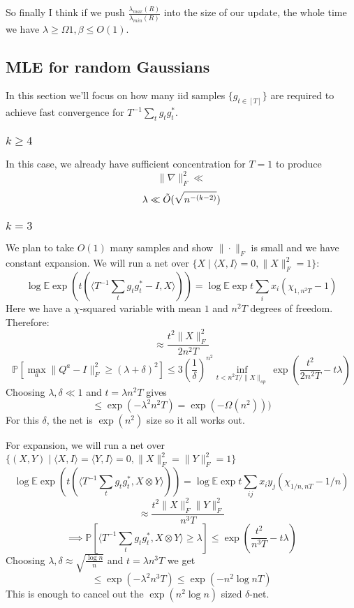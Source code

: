 \documentclass{article}
\newcommand{\E}{\mathbb{E}}
\renewcommand{\Pr}{\mathbb{P}}
\begin{document}
So finally I think if we push $\frac{\lambda_{max}(R)}{\lambda_{min}(R)}$ into the size of our update, the whole time we have $\lambda \geq \Omega 1, \beta \leq O(1)$. 


\subsection{MLE for random Gaussians}
In this section we'll focus on how many iid samples $\{g_{t \in [T]}\} $ are required to achieve fast convergence for $T^{-1} \sum_{t} g_{t} g_{t}^{*}$. 

\subsubsection{$k \geq 4$}
In this case, we already have sufficient concentration for $T=1$ to produce
\[ \|\nabla\|_{F}^{2} \ll    \]
\[ \lambda \ll \Tilde{O}(\sqrt{n^{-(k-2)}})   \]

\subsubsection{$k=3$}
We plan to take $O(1)$ many samples and show $\|\cdot\|_{F}$ is small and we have constant expansion. We will run a net over $\{X \mid \langle X, I \rangle = 0, \|X\|_{F}^{2} = 1\}$:
\[ \log \E \exp ( t (\langle T^{-1} \sum_{t} g_{t} g_{t}^{*} - I, X \rangle) ) = \log \E \exp t \sum_{i} x_{i} (\chi_{1,n^{2}T} - 1)  \]
Here we have a $\chi$-squared variable with mean $1$ and $n^{2} T$ degrees of freedom. Therefore:
\[ \approx \frac{t^{2} \|X\|_{F}^{2}}{2 n^{2} T}  \]
\[ \Pr[\max_{a} \|Q^{a} - I\|_{F}^{2} \geq (\lambda+\delta)^{2}] \leq 3 \left(\frac{1}{\delta} \right)^{n^{2}} \inf_{t < n^{2} T/\|X\|_{op}} \exp \left( \frac{t^{2}}{2 n^{2} T} - t \lambda \right) \]
Choosing $\lambda, \delta \ll 1$ and $t = \lambda n^{2} T$ gives 
\[ \leq \exp ( - \lambda^{2} n^{2} T ) = \exp ( - \Omega(n^{2})  )   )  \]
For this $\delta$, the net is $\exp(n^{2})$ size so it all works out. 

For expansion, we will run a net over $\{(X,Y) \mid \langle X, I \rangle = \langle Y, I \rangle = 0, \|X\|_{F}^{2} = \|Y\|_{F}^{2} = 1\}$
\[ \log \E \exp ( t (\langle T^{-1} \sum_{t} g_{t} g_{t}^{*}, X \otimes Y \rangle) ) = \log \E \exp t \sum_{ij} x_{i} y_{j} (\chi_{1/n, nT} - 1/n) \]
\[ \approx \frac{t^{2} \|X\|_{F}^{2} \|Y\|_{F}^{2}}{n^{3} T}  \]
\[ \implies \Pr [ \langle T^{-1} \sum_{t} g_{t} g_{t}^{*}, X \otimes Y \rangle \geq \lambda ] \leq \exp \left( \frac{t^{2}}{n^{3} T} - t \lambda   \right)   \]
Choosing $\lambda, \delta \approx \sqrt{\frac{\log n}{n}}$ and $t = \lambda n^{3} T$ we get
\[ \leq \exp ( - \lambda^{2} n^{3} T ) \leq \exp ( - n^{2} \log n T )  \]
This is enough to cancel out the $\exp(n^{2} \log n)$ sized $\delta$-net. 
\end{document}
